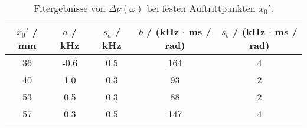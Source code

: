 \begin{table}[H]
\caption{Fitergebnisse von $\Delta \nu(\omega)$ bei festen Auftrittpunkten $x_0'$.}
\begin{center}
\begin{tabular}{|c|c|c|c|c|}
  \hline
  $x_0'$ / mm & $a$ / kHz & $s_{a}$ / kHz & $b$ / (kHz $\cdot$ ms / rad) & $s_b$ / (kHz $\cdot$ ms / rad) \\ \hline
  36 & -0.6 & 0.5 & 164 & 4 \\ \hline
  40 & 1.0 & 0.3 & 93 & 2 \\ \hline
  53 & 0.5 & 0.3 & 88 & 2 \\ \hline
  57 & 0.3 & 0.5 & 147 & 4 \\ \hline
\end{tabular}
\end{center}
\label{tab:fit:T}
\end{table}

